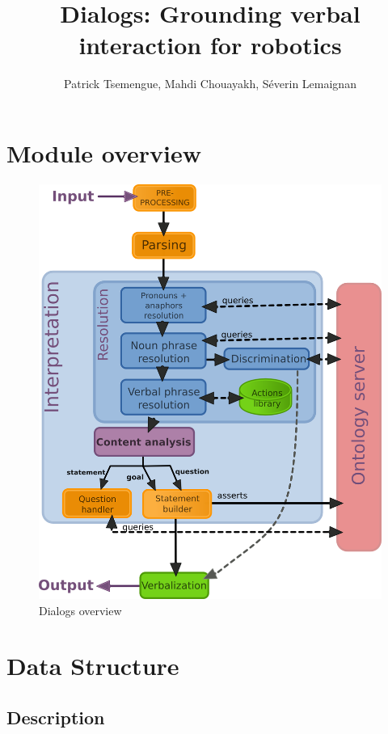 \documentclass[twoside,a4paper,10pt]{report}
\title{ Dialogs: Grounding verbal interaction for robotics}
\author{Patrick Tsemengue, Mahdi Chouayakh, Séverin Lemaignan}
\begin{document}
\sffamily
\allsectionsfont{\sffamily}

\thispagestyle{empty}
\maketitle
\thispagestyle{empty}
\cleardoublepage
\tableofcontents
\newpage
\thispagestyle{plain}
\cleardoublepage
\newpage



\chapter{Module overview}
\label{f0e926ab940662bebfe368ba24960a2d}%

\begin{figure}[h]
\centering
\includegraphics[width=0.7\linewidth]{dialogs_module_simple.png}
\caption{Dialogs overview}
\end{figure}



\chapter{Data Structure}
\label{c8f6850ec2ec3fb32f203c1f4e3c2fd2}%

\section{Description}
\label{67daf92c833c41c95db874e18fcb2786}%
\end{document}
